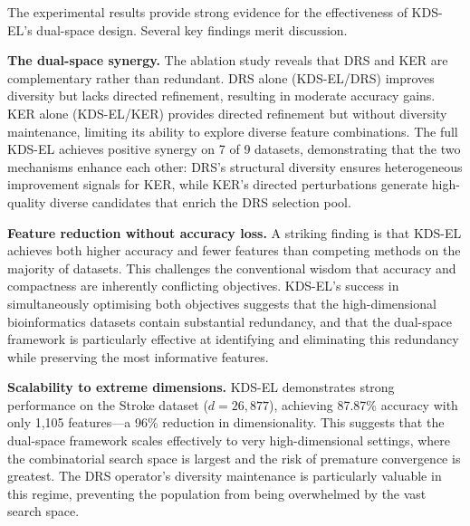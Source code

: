 \documentclass[a4paper,fleqn]{cas-dc}
\begin{document}
\begin{sloppypar}
	\par{
	The experimental results provide strong evidence for the
	effectiveness of KDS-EL's dual-space design.
	Several key findings merit discussion.
	}

	\par{
	\textbf{The dual-space synergy.}
	The ablation study reveals that DRS and KER are complementary rather
	than redundant.
	DRS alone (KDS-EL/DRS) improves diversity but lacks directed
	refinement, resulting in moderate accuracy gains.
	KER alone (KDS-EL/KER) provides directed refinement but without
	diversity maintenance, limiting its ability to explore diverse
	feature combinations.
	The full KDS-EL achieves positive synergy on 7 of 9 datasets,
	demonstrating that the two mechanisms enhance each other: DRS's
	structural diversity ensures heterogeneous improvement signals for
	KER, while KER's directed perturbations generate high-quality
	diverse candidates that enrich the DRS selection pool.
	}

	\par{
	\textbf{Feature reduction without accuracy loss.}
	A striking finding is that KDS-EL achieves both higher accuracy
	and fewer features than competing methods on the majority of
	datasets.
	This challenges the conventional wisdom that accuracy and
	compactness are inherently conflicting objectives.
	KDS-EL's success in simultaneously optimising both objectives
	suggests that the high-dimensional bioinformatics datasets contain
	substantial redundancy, and that the dual-space framework is
	particularly effective at identifying and eliminating this
	redundancy while preserving the most informative features.
	}

	\par{
	\textbf{Scalability to extreme dimensions.}
	KDS-EL demonstrates strong performance on the Stroke dataset
	($d = 26{,}877$), achieving 87.87\% accuracy with only 1,105
	features---a 96\% reduction in dimensionality.
	This suggests that the dual-space framework scales effectively
	to very high-dimensional settings, where the combinatorial search
	space is largest and the risk of premature convergence is greatest.
	The DRS operator's diversity maintenance is particularly valuable
	in this regime, preventing the population from being overwhelmed
	by the vast search space.
	}


\end{sloppypar}
\end{document}
